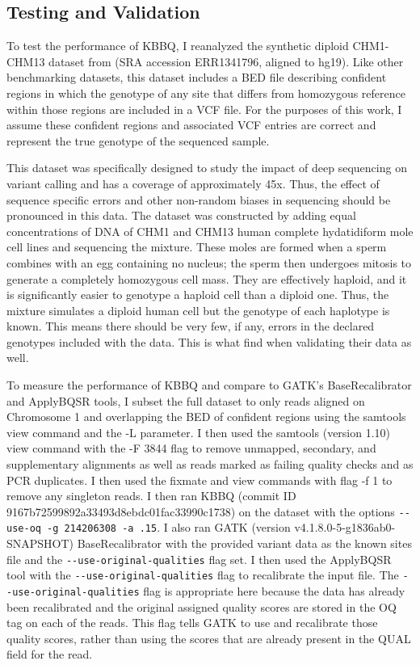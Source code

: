 \subsection{Testing and Validation}
To test the performance of KBBQ, I reanalyzed the synthetic diploid CHM1-CHM13 dataset from \cite{li_synthetic-diploid_2018} (SRA accession ERR1341796, aligned to hg19). Like other benchmarking datasets, this dataset includes a BED file describing confident regions in which the genotype of any site that differs from homozygous reference within those regions are included in a VCF file. For the purposes of this work, I assume these confident regions and associated VCF entries are correct and represent the true genotype of the sequenced sample.

This dataset was specifically designed to study the impact of deep sequencing on variant calling and has a coverage of approximately 45x. Thus, the effect of sequence specific errors and other non-random biases in sequencing should be pronounced in this data.
The dataset was constructed by adding equal concentrations of DNA of CHM1 and CHM13 human complete hydatidiform mole cell lines and sequencing the mixture. These moles are formed when a sperm combines with an egg containing no nucleus; the sperm then undergoes mitosis to generate a completely homozygous cell mass. They are effectively haploid, and it is significantly easier to genotype a haploid cell than a diploid one. Thus, the mixture simulates a diploid human cell but the genotype of each haplotype is known. This means there should be very few, if any, errors in the declared genotypes included with the data. This is what \cite{li_synthetic-diploid_2018} find when validating their data as well.

To measure the performance of KBBQ and compare to GATK's BaseRecalibrator and ApplyBQSR tools, I subset the full dataset to only reads aligned on Chromosome 1 and overlapping the BED of confident regions using the samtools view command \parencite{li_sequence_2009} and the -L parameter. I then used the samtools (version 1.10) view command with the -F 3844 flag to remove unmapped, secondary, and supplementary alignments as well as reads marked as failing quality checks and as PCR duplicates. I then used the fixmate and view commands with flag -f 1 to remove any singleton reads. I then ran KBBQ (commit ID 9167b72599892a33493d8ebdc01fac33990c1738) on the dataset with the options \texttt{-\phantom{}-use-oq -g 214206308 -a .15}. I also ran GATK (version v4.1.8.0-5-g1836ab0-SNAPSHOT) BaseRecalibrator with the provided variant data as the known sites file and the \texttt{-\phantom{}-use-original-qualities} flag set. I then used the ApplyBQSR tool with the \texttt{-\phantom{}-use-original-qualities} flag to recalibrate the input file. The \texttt{-\phantom{}-use-original-qualities} flag is appropriate here because the data has already been recalibrated and the original assigned quality scores are stored in the OQ tag on each of the reads. This flag tells GATK to use and recalibrate those quality scores, rather than using the scores that are already present in the QUAL field for the read.

